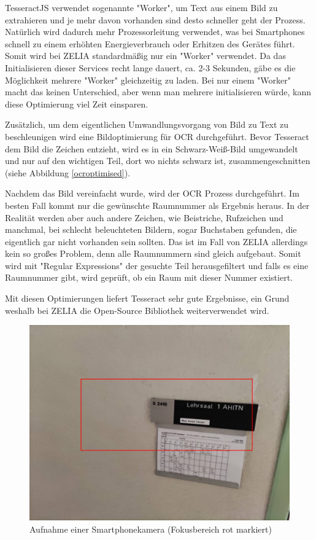 
TesseractJS verwendet sogenannte "Worker", um Text aus einem Bild zu extrahieren und je mehr davon vorhanden sind desto schneller geht der Prozess. Natürlich wird dadurch mehr Prozessorleitung verwendet, was bei Smartphones schnell zu einem erhöhten Energieverbrauch oder Erhitzen des Gerätes führt. Somit wird bei ZELIA standardmäßig nur ein "Worker" verwendet. Da das Initialisieren dieser Services recht lange dauert, ca. 2-3 Sekunden, gäbe es die Möglichkeit mehrere "Worker" gleichzeitig zu laden. Bei nur einem "Worker" macht das keinen Unterschied, aber wenn man mehrere initialisieren würde, kann diese Optimierung viel Zeit einsparen.

Zusätzlich, um dem eigentlichen Umwandlungsvorgang von Bild zu Text zu beschleunigen wird eine Bildoptimierung für OCR durchgeführt. Bevor Tesseract dem Bild die Zeichen entzieht, wird es in ein Schwarz-Weiß-Bild umgewandelt und nur auf den wichtigen Teil, dort wo nichts schwarz ist, zusammengeschnitten (siehe Abbildung \ref{ocroptimised}).

Nachdem das Bild vereinfacht wurde, wird der OCR Prozess durchgeführt. Im besten Fall kommt nur die gewünschte Raumnummer als Ergebnis heraus. In der Realität werden aber auch andere Zeichen, wie Beistriche, Rufzeichen und manchmal, bei schlecht beleuchteten Bildern, sogar Buchstaben gefunden, die eigentlich gar nicht vorhanden sein sollten. Das ist im Fall von ZELIA allerdings kein so großes Problem, denn alle Raumnummern sind gleich aufgebaut. Somit wird mit "Regular Expressions" der gesuchte Teil herausgefiltert und falls es eine Raumnummer gibt, wird geprüft, ob ein Raum mit dieser Nummer existiert.

Mit diesen Optimierungen liefert Tesseract sehr gute Ergebnisse, ein Grund weshalb bei ZELIA die Open-Source Bibliothek weiterverwendet wird.


\begin{figure}
    \centering
    \includegraphics[width=120mm]{media/OCR/original}
    \caption{Aufnahme einer Smartphonekamera (Fokusbereich rot markiert)}
    \label{fig:phonecam}
\end{figure}


